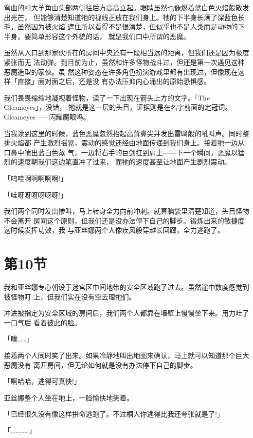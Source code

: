 \documentclass[11pt]{book}
\begin{document}
弯曲的粗大羊角由头部两侧往后方高高立起。眼睛虽然也像燃着蓝白色火焰般散发出光芒，
但能够清楚知道牠的视线正放在我们身上。牠的下半身长满了深蓝色长毛，虽然因为被火焰
遮住所以看得不是很清楚，但似乎也不是人类而是动物的下半身。要简单形容这个外貌的话，
就是我们口中所谓的恶魔。

虽然从入口到那家伙所在的房间中央还有一段相当远的距离，但我们还是因为极度紧张而无
法动弹。到目前为止，虽然和许多怪物战斗过，但还是第一次遇见这种恶魔造型的家伙。虽
然这种姿态在许多角色扮演游戏里都有出现过，但像现在这样「直接」面对面之后，还是没
有办法压抑内心涌出的原始恐惧感。

我们畏畏缩缩地凝视着怪物，读了一下出现在箭头上方的文字。「The Gleameyes」，没错，
牠就是这一层的头目，证据则是在名字前面的定冠词。Gleameyes——闪耀魔眼吗。







当我读到这里的时候，蓝色恶魔忽然抬起高耸鼻尖并发出雷鸣般的吼叫声。同时整排火焰都
产生激烈摇晃，震动的感觉还经由地面传递到我们身上。接着牠一边从口鼻中喷出蓝白色蒸
气，一边将右手的巨剑扛到肩上——下一个瞬间，恶魔以猛烈的速度朝我们这边笔直冲了过来，
而牠的速度甚至让地面产生剧烈震动。

「呜哇啊啊啊啊啊!」

「哇呀呀呀呀呀呀!」

我们两个同时发出惨叫，马上转身全力向前冲刺。就算脑袋里清楚知道，头目怪物不会离开
房间这个原则，但我们还是没办法停下自己的脚步。锻炼出来的敏捷度这时候发挥功效，我
与亚丝娜两个人像疾风般穿越长回廊，全力逃跑了。
\section{第10节}
\label{sec:org8889a0b}
我和亚丝娜专心朝设于迷宫区中间地带的安全区域跑了过去。虽然途中数度感觉到被怪物盯
上，但我们实在没有空去理牠们。

冲进被指定为安全区域的房间后，我们两个人都靠在墙壁上慢慢坐下来。用力吐了一口气后
看着彼此的脸。

「噗……」

接着两个人同时笑了出来。如果冷静地叫出地图来确认，马上就可以知道那个巨大恶魔没有
离开房间，但无论如何就是没有办法停下自己的脚步。

「啊哈哈，逃得可真快!」

亚丝娜整个人坐在地上，一脸愉快地笑着。

「已经很久没有像这样拚命逃跑了。不过桐人你逃得比我还夸张就是了!」

「…………」
\end{document}
